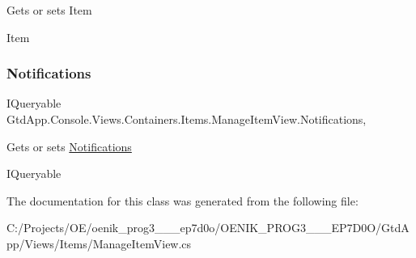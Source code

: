 Gets or sets Item 

Item\mbox{\label{class_gtd_app_1_1_console_1_1_views_1_1_containers_1_1_items_1_1_manage_item_view_a4a65e1259ef77380c72f051305a32de4}} 
\subsubsection{\texorpdfstring{Notifications}{Notifications}}
{\footnotesize\ttfamily I\+Queryable Gtd\+App.\+Console.\+Views.\+Containers.\+Items.\+Manage\+Item\+View.\+Notifications\hspace{0.3cm}{\ttfamily [get]}, {\ttfamily [set]}}



Gets or sets \mbox{\hyperlink{namespace_gtd_app_1_1_console_1_1_views_1_1_notifications}{Notifications}} 

I\+Queryable

The documentation for this class was generated from the following file\+:\begin{DoxyCompactItemize}
\item 
C\+:/\+Projects/\+O\+E/oenik\+\_\+prog3\+\_\+\_\+\_\+ep7d0o/\+O\+E\+N\+I\+K\+\_\+\+P\+R\+O\+G3\+\_\+\_\+\_\+\+E\+P7\+D0\+O/\+Gtd\+App/\+Views/\+Items/Manage\+Item\+View.\+cs\end{DoxyCompactItemize}
